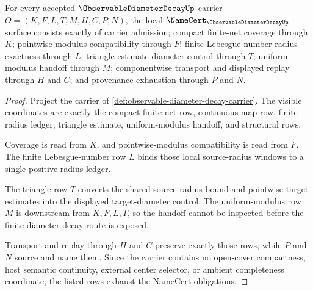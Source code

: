 \begin{theorem}
\label{thm:observable-diameter-decay-namecert-obligations}
For every accepted $\ObservableDiameterDecayUp$ carrier $O=(K,F,L,T,M,H,C,P,N)$, the local $\NameCert_{\ObservableDiameterDecayUp}$ surface consists exactly of carrier admission; compact finite-net coverage through $K$; pointwise-modulus compatibility through $F$; finite Lebesgue-number radius exactness through $L$; triangle-estimate diameter control through $T$; uniform-modulus handoff through $M$; componentwise transport and displayed replay through $H$ and $C$; and provenance exhaustion through $P$ and $N$.
\end{theorem}
\begin{proof}
Project the carrier of \autoref{def:observable-diameter-decay-carrier}. The visible coordinates are exactly the compact finite-net row, continuous-map row, finite radius ledger, triangle estimate, uniform-modulus handoff, and structural rows.

Coverage is read from $K$, and pointwise-modulus compatibility is read from $F$. The finite Lebesgue-number row $L$ binds those local source-radius windows to a single positive radius ledger.

The triangle row $T$ converts the shared source-radius bound and pointwise target estimates into the displayed target-diameter control. The uniform-modulus row $M$ is downstream from $K,F,L,T$, so the handoff cannot be inspected before the finite diameter-decay route is exposed.

Transport and replay through $H$ and $C$ preserve exactly those rows, while $P$ and $N$ source and name them. Since the carrier contains no open-cover compactness, host semantic continuity, external center selector, or ambient completeness coordinate, the listed rows exhaust the NameCert obligations.
\end{proof}


